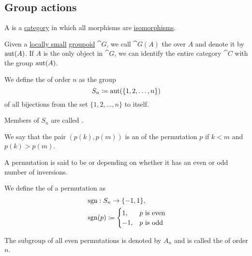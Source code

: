 \subsection{Group actions}\label{subsec:group_actions}

\begin{definition}\label{def:groupoid}
  A  is a \hyperref[def:category]{category} in which all morphisms are \hyperref[def:morphism_invertibility]{isomorphisms}.
\end{definition}

\begin{definition}\label{def:automorphism_group}
  Given a \hyperref[def:category_cardinality]{locally small} \hyperref[def:groupoid]{groupoid} \( \cat{G} \), we call \( \cat{G}(A) \) the  over \( A \) and denote it by \( \operatorname{aut}(A) \). If \( A \) is the only object in \( \cat{G} \), we can identify the entire category \( \cat{C} \) with the group \( \operatorname{aut}(A) \).
\end{definition}

\begin{definition}\label{def:symmetric_group}
  We define the  of order \( n \) as the group
  \begin{equation*}
    S_n \coloneqq \operatorname{aut}(\{ 1, 2, \ldots, n \})
  \end{equation*}
  of all bijections from the set \( \{ 1, 2, \ldots, n \} \) to itself.

  \begin{thmenum}
     Members of \( S_n \) are called .

     We say that the pair \( (p(k), p(m)) \) is an  of the permutation \( p \) if \( k < m \) and \( p(k) > p(m) \).

     A permutation is said to be  or  depending on whether it has an even or odd number of inversions.

     We define the  of a permutation as
    \begin{align*}
       &\operatorname{sgn}: S_n \to \{ -1, 1 \}, \\
       &\operatorname{sgn}(p) \coloneqq \begin{cases}
        1,  &p \text{ is even} \\
        -1, &p \text{ is odd}
      \end{cases}
    \end{align*}

     The subgroup of all even permutations is denoted by \( A_n \) and is called the  of order \( n \).
  \end{thmenum}
\end{definition}

